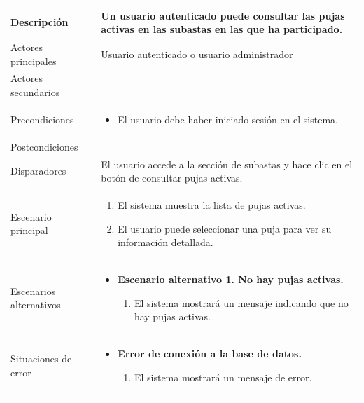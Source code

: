\begin{longtable}{
    >{\columncolor{lightgreen!20}}p{4cm}
    p{12cm}
    }
    \midrule
    Descripción & Un usuario autenticado puede consultar las pujas activas en las subastas en las que ha participado. \\
    \midrule
    Actores principales & Usuario autenticado o usuario administrador \\
    \midrule
    Actores secundarios &  \\
    \midrule
    Precondiciones & \begin{itemize}[nosep,leftmargin=*]
        \item El usuario debe haber iniciado sesión en el sistema.
    \end{itemize} \\
    \midrule
    Postcondiciones &  \\
    \midrule
    Disparadores & El usuario accede a la sección de subastas y hace clic en el botón de consultar pujas activas. \\
    \midrule
    Escenario principal & \begin{enumerate}[nosep,leftmargin=*]
        \item El sistema muestra la lista de pujas activas.
        \item El usuario puede seleccionar una puja para ver su información detallada.
    \end{enumerate} \\
    \midrule
    Escenarios alternativos & 
    \begin{itemize}[nosep,leftmargin=*]
        \item \textbf{Escenario alternativo 1. No hay pujas activas.}
        \begin{enumerate}[nosep,leftmargin=*]
            \item El sistema mostrará un mensaje indicando que no hay pujas activas.
        \end{enumerate}
    \end{itemize} \\
    \midrule
    Situaciones de error & 
    \begin{itemize}[nosep,leftmargin=*]
        \item \textbf{Error de conexión a la base de datos.}
        \begin{enumerate}[nosep,leftmargin=*]
            \item El sistema mostrará un mensaje de error.
        \end{enumerate}
    \end{itemize} \\
\end{longtable}

